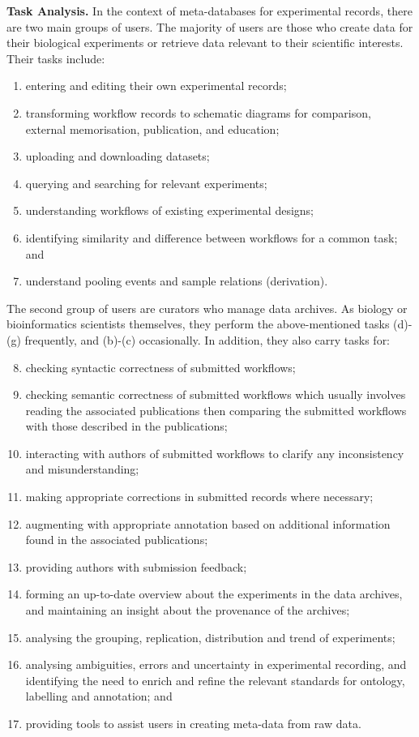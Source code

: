 \textbf{Task Analysis.} In the context of meta-databases for experimental records, there are two main groups of users. The majority of users are those who create data for their biological experiments or retrieve data relevant to their scientific interests. Their tasks include:
\begin{enumerate}[label=(\alph*)]
\item entering and editing their own experimental records;
\item transforming workflow records to schematic diagrams for comparison, external memorisation, publication, and education;
\item uploading and downloading datasets;
\item querying and searching for relevant experiments;
\item understanding workflows of existing experimental designs;
\item identifying similarity and difference between workflows for a common task; and
\item understand pooling events and sample relations (derivation).
\end{enumerate}

The second group of users are curators who manage data archives. As biology or bioinformatics scientists themselves, they perform the above-mentioned tasks (d)-(g) frequently, and (b)-(c) occasionally. In addition, they also carry tasks for:
\begin{enumerate}[label=(\alph*)]
\setcounter{enumi}{7}
\item checking syntactic correctness of submitted workflows;
\item checking semantic correctness of submitted workflows which usually involves reading the associated publications then comparing the submitted workflows with those described in the publications;
\item interacting with authors of submitted workflows to clarify any inconsistency and misunderstanding;
\item making appropriate corrections in submitted records where necessary;
\item augmenting with appropriate annotation based on additional information found in the associated publications;
\item providing authors with submission feedback;
\item forming an up-to-date overview about the experiments in the data archives, and maintaining an insight about the provenance of the archives;
\item analysing the grouping, replication, distribution and trend of experiments;
\item analysing ambiguities, errors and uncertainty in experimental recording, and identifying the need to enrich and refine the relevant standards for ontology, labelling and annotation; and
\item providing tools to assist users in creating meta-data from raw data.
\end{enumerate}

